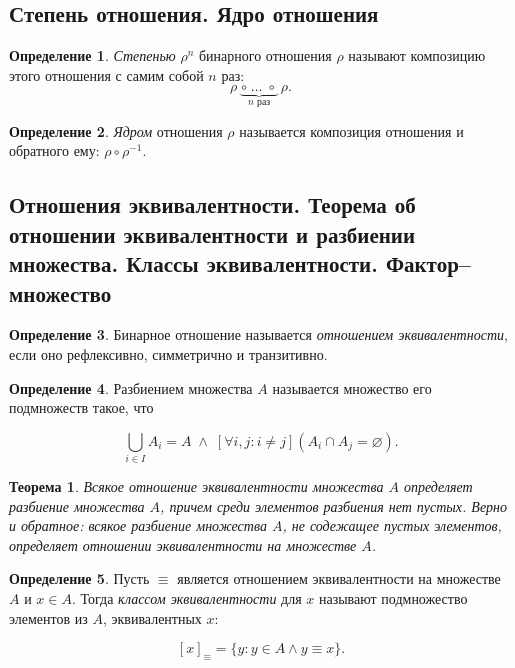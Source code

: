 \documentclass{article}
\newtheorem*{theorem*}{Теорема}
\theoremstyle{plain}
\theoremstyle{definition}
\newtheorem{definition}{Определение}[subsection]
\begin{document}
\subsection{Степень отношения. Ядро отношения}

\begin{definition}
	\textit{Степенью} \(\rho^n\) бинарного отношения \(\rho\) называют композицию этого отношения с самим собой \(n\) раз: \[\rho\; \underbrace{\circ\; \ldots\; \circ}_\text{$n$ раз}\; \rho.\]
\end{definition}

\begin{definition}
	\textit{Ядром} отношения \(\rho\) называется композиция отношения и обратного ему: \(\rho \circ \rho^{-1}\).
\end{definition}

\subsection{Отношения эквивалентности. Теорема об отношении эквивалентности и разбиении множества. Классы эквивалентности. Фактор–множество}

\begin{definition}
	Бинарное отношение называется \textit{отношением эквивалентности}, если оно рефлексивно, симметрично и транзитивно.
\end{definition}

\begin{definition}
	Разбиением множества \(A\) называется множество его подмножеств такое, что

	\[
		\bigcup \limits _{{i \in I}}A_{i} = A \;\land\; [\forall i, j \colon i \neq j] (A_i \cap A_j = \varnothing).
	\]
\end{definition}

\begin{theorem*}
	Всякое отношение эквивалентности множества \(A\) определяет разбиение множества \(A\), причем среди элементов разбиения нет пустых. Верно и обратное: всякое разбиение множества \(A\), не содежащее пустых элементов, определяет отношении эквивалентности на множестве \(A\).
\end{theorem*}

\begin{definition}
	Пусть \(\equiv\) является отношением эквивалентности на множестве \(A\) и \(x \in A\). Тогда \textit{классом эквивалентности} для \(x\) называют подмножество элементов из \(A\), эквивалентных \(x\):

	\[
		[x]_{\equiv} = \{ y \colon y \in A \land y \equiv x \}.
	\]
\end{definition}
\end{document}
